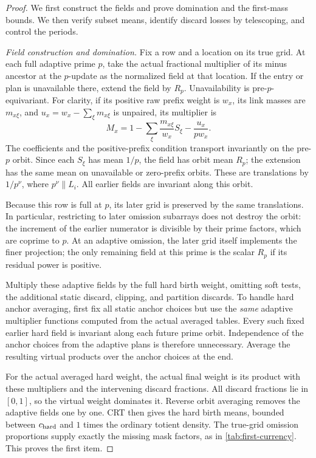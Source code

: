 \begin{proof}
We first construct the fields and prove domination and the first-mass
bounds.  We then verify subset means, identify discard losses by
telescoping, and control the periods.

\emph{Field construction and domination.}\quad
Fix a row and a location on its true grid.  At each full adaptive
prime $p$, take the actual fractional multiplier of its minus
ancestor at the $p$-update as the normalized field at that
location.  If the entry or plan is unavailable there, extend the
field by $R_p$.  Unavailability is pre-$p$-equivariant.
For clarity, if its positive raw prefix weight is $w_x$, its
link masses are $m_{x\xi}$, and
$u_x=w_x-\sum_\xi m_{x\xi}$ is unpaired, its multiplier is
\[
 M_x=1-\sum_\xi\frac{m_{x\xi}}{w_x}S_\xi
          -\frac{u_x}{p w_x}.
\]
The coefficients and the positive-prefix condition transport
invariantly on the pre-$p$ orbit.  Since each $S_\xi$ has mean
$1/p$, the field has orbit mean $R_p$; the extension has the
same mean on unavailable or zero-prefix orbits.  These are
translations by $1/p^\nu$, where $p^\nu\parallel L_i$.
All earlier fields are invariant along this orbit.

Because this row is full at $p$, its later grid is preserved by
the same translations.  In particular, restricting to later
omission subarrays does not destroy the orbit: the increment of
the earlier numerator is divisible by their prime factors,
which are coprime to $p$.  At an adaptive omission, the later
grid itself implements the finer projection; the only remaining
field at this prime is the scalar $R_p$ if its residual power is
positive.

Multiply these adaptive fields by the full hard birth weight,
omitting soft tests, the additional static discard, clipping,
and partition discards.  To handle hard anchor averaging, first
fix all static anchor choices but use the \emph{same} adaptive
multiplier functions computed from the actual averaged tables.
Every such fixed earlier hard field is invariant along each
future prime orbit.  Independence of the anchor choices from
the adaptive plans is therefore unnecessary.  Average the
resulting virtual products over the anchor choices at the end.

For the actual averaged hard weight, the actual final weight is
its product with these multipliers and the intervening discard
fractions.  All discard fractions lie in $[0,1]$, so the virtual
weight dominates it.  Reverse orbit averaging removes the
adaptive fields one by one.  CRT then gives the hard birth
means, bounded between $c_{\rm hard}$ and $1$ times the ordinary
totient density.  The true-grid omission proportions supply
exactly the missing mask factors, as in
\eqref{tab:first-currency}.  This proves the first item.


\end{proof}
